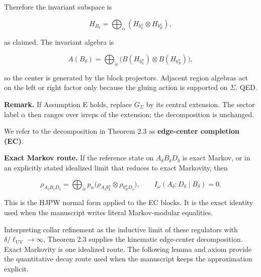 Therefore the invariant subspace is

\[
H_{B_\delta} = \bigoplus_\alpha (H_{b_L^\alpha} \otimes H_{b_R^\alpha}),
\]

as claimed. The invariant algebra is

\[
A(B_\delta) = \bigoplus_\alpha
\bigl(B(H_{b_L^\alpha}) \otimes B(H_{b_R^\alpha})\bigr),
\]

so the center is generated by the block projectors. Adjacent region algebras act on the left or right factor only because the gluing action is supported on \(\Sigma\). QED.

\textbf{Remark.} If Assumption E holds, replace \(G_\Sigma\) by its central extension. The sector label \(\alpha\) then ranges over irreps of the extension; the decomposition is unchanged.

We refer to the decomposition in Theorem 2.3 as \textbf{edge-center completion (EC)}.

\textbf{Exact Markov route.} If the reference state on \(A_\delta B_\delta D_\delta\) is exact Markov, or in an explicitly stated idealized limit that reduces to exact Markovity, then

\[
\rho_{A_\delta B_\delta D_\delta}
= \bigoplus_\alpha p_\alpha
\bigl(\rho_{A_\delta b_L^\alpha} \otimes \rho_{b_R^\alpha D_\delta}\bigr),
\qquad
I_\omega(A_\delta:D_\delta \mid B_\delta)=0.
\]

This is the HJPW normal form applied to the EC blocks. It is the exact identity used when the manuscript writes literal Markov-modular equalities.

Interpreting collar refinement as the inductive limit of these regulators with \(\delta/\ell_{\mathrm{UV}} \to \infty\), Theorem 2.3 supplies the kinematic edge-center decomposition. Exact Markovity is one idealized route. The following lemma and axiom provide the quantitative decay route used when the manuscript keeps the approximation explicit.

